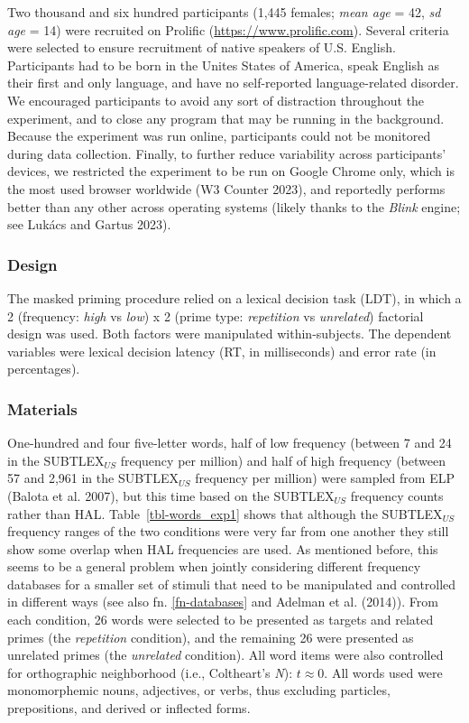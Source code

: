 \documentclass[
]{interact}
\begin{document}
Two thousand and six hundred participants (1,445 females; \emph{mean
age} = 42, \emph{sd age} = 14) were recruited on Prolific
(\url{https://www.prolific.com}). Several criteria were selected to
ensure recruitment of native speakers of U.S. English. Participants had
to be born in the Unites States of America, speak English as their first
and only language, and have no self-reported language-related disorder.
We encouraged participants to avoid any sort of distraction throughout
the experiment, and to close any program that may be running in the
background. Because the experiment was run online, participants could
not be monitored during data collection. Finally, to further reduce
variability across participants' devices, we restricted the experiment
to be run on Google Chrome only, which is the most used browser
worldwide (W3 Counter 2023), and reportedly performs better than any
other across operating systems (likely thanks to the \emph{Blink}
engine; see Lukács and Gartus 2023).

\subsubsection{Design}\label{sec-exp1-methods-design}

The masked priming procedure relied on a lexical decision task (LDT), in
which a 2 (frequency: \emph{high} vs \emph{low}) x 2 (prime type:
\emph{repetition} vs \emph{unrelated}) factorial design was used. Both
factors were manipulated within-subjects. The dependent variables were
lexical decision latency (RT, in milliseconds) and error rate (in
percentages).

\subsubsection{Materials}\label{sec-exp1-methods-materials}

One-hundred and four five-letter words, half of low frequency (between 7
and 24 in the SUBTLEX\(_{US}\) frequency per million) and half of high
frequency (between 57 and 2,961 in the SUBTLEX\(_{US}\) frequency per
million) were sampled from ELP (Balota et al. 2007), but this time based
on the SUBTLEX\(_{US}\) frequency counts rather than HAL.
Table~\ref{tbl-words_exp1} shows that although the SUBTLEX\(_{US}\)
frequency ranges of the two conditions were very far from one another
they still show some overlap when HAL frequencies are used. As mentioned
before, this seems to be a general problem when jointly considering
different frequency databases for a smaller set of stimuli that need to
be manipulated and controlled in different ways (see also fn.
\ref{fn-databases} and Adelman et al. (2014)). From each condition, 26
words were selected to be presented as targets and related primes (the
\emph{repetition} condition), and the remaining 26 were presented as
unrelated primes (the \emph{unrelated} condition). All word items were
also controlled for orthographic neighborhood (i.e., Coltheart's
\emph{N}): \(t \approx 0\). All words used were monomorphemic nouns,
adjectives, or verbs, thus excluding particles, prepositions, and
derived or inflected forms.
\end{document}
